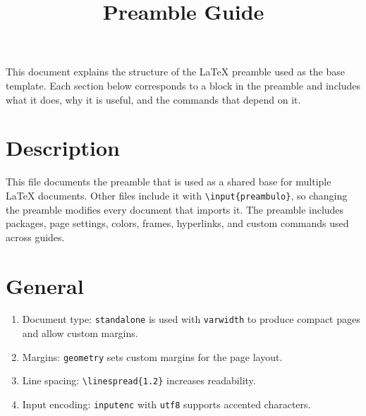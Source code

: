 

\title{\LARGE Preamble Guide}
\date{}


	
	\begin{minipage}{\anchoPag}
		\thispagestyle{empty}
		\background
		
		\maketitle
		\vspace{-2cm}
		
		\begin{mdframed}[style=estiloGeneral]
			This document explains the structure of the LaTeX preamble used as the base template. Each section below corresponds to a block in the preamble and includes what it does, why it is useful, and the commands that depend on it.
		\end{mdframed}
		
		\section{Description}
		
		This file documents the preamble that is used as a shared base for multiple LaTeX documents. Other files include it with \texttt{\textbackslash input\{preambulo\}}, so changing the preamble modifies every document that imports it. The preamble includes packages, page settings, colors, frames, hyperlinks, and custom commands used across guides.
		
		\section{General}\label{sec:general}
		
		\begin{enumerate}
			\item Document type: \texttt{standalone} is used with \texttt{varwidth} to produce compact pages and allow custom margins.
			\item Margins: \texttt{geometry} sets custom margins for the page layout.
			\item Line spacing: \texttt{\textbackslash linespread\{1.2\}} increases readability.
			\item Input encoding: \texttt{inputenc} with \texttt{utf8} supports accented characters.
		\end{enumerate}
		

\end{minipage}
